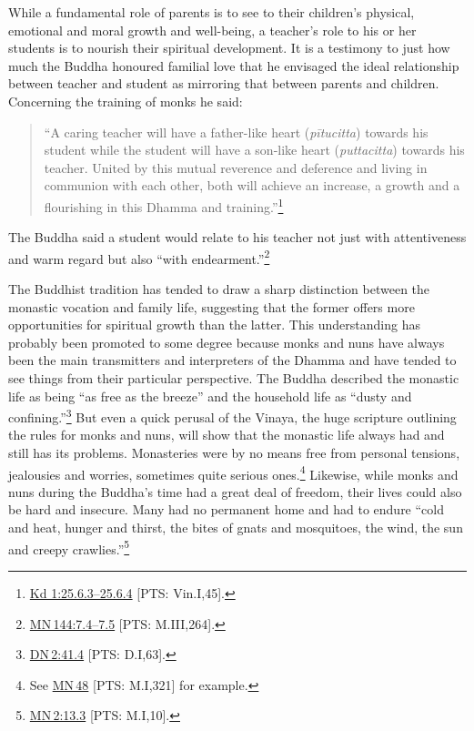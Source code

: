 \documentclass[10pt, openright]{book}
\begin{document}
While a fundamental role of parents is to see to their children’s physical, emotional and moral growth and well-being, a teacher’s role to his or her students is to nourish their spiritual development. It is a testimony to just how much the Buddha honoured familial love that he envisaged the ideal relationship between teacher and student as mirroring that between parents and children. Concerning the training of monks he said:


\begin{quote}


“A caring teacher will have a father-like heart (\textit{pītucitta}) towards his student while the student will have a son-like heart (\textit{puttacitta}) towards his teacher. United by this mutual reverence and deference and living in communion with each other, both will achieve an increase, a growth and a flourishing in this Dhamma and training.”\footnote {\href{https://suttacentral.net/pli-tv-kd1/en/brahmali#25.6.3}{Kd 1:25.6.3–25.6.4} [PTS: Vin.I,45].}




\end{quote}
The Buddha said a student would relate to his teacher not just with attentiveness and warm regard but also “with endearment.”\footnote {\href{https://suttacentral.net/mn144/en/sujato\#7.4}{MN 144:7.4–7.5} [PTS: M.III,264].}


The Buddhist tradition has tended to draw a sharp distinction between the monastic vocation and family life, suggesting that the former offers more opportunities for spiritual growth than the latter. This understanding has probably been promoted to some degree because monks and nuns have always been the main transmitters and interpreters of the Dhamma and have tended to see things from their particular perspective. The Buddha described the monastic life as being “as free as the breeze” and the household life as “dusty and confining.”\footnote {\href{https://suttacentral.net/dn2/en/sujato\#41.4}{DN 2:41.4} [PTS: D.I,63].} But even a quick perusal of the Vinaya, the huge scripture outlining the rules for monks and nuns, will show that the monastic life always had and still has its problems. Monasteries were by no means free from personal tensions, jealousies and worries, sometimes quite serious ones.\footnote {See \href{https://suttacentral.net/mn48/en/sujato}{MN 48} [PTS: M.I,321] for example.} Likewise, while monks and nuns during the Buddha’s time had a great deal of freedom, their lives could also be hard and insecure. Many had no permanent home and had to endure “cold and heat, hunger and thirst, the bites of gnats and mosquitoes, the wind, the sun and creepy crawlies.”\footnote {\href{https://suttacentral.net/mn2/en/sujato\#13.3}{MN 2:13.3} [PTS: M.I,10].}
\end{document}
